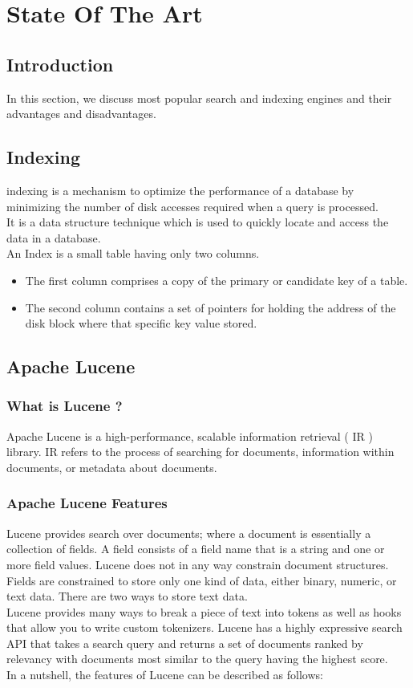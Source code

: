\chapter{State Of The Art}

\section{Introduction}
In this section, we discuss most popular search and indexing engines and their advantages and disadvantages.
 

\section{Indexing}

indexing is a mechanism to optimize the performance of a database by minimizing the number of disk accesses required when a query is processed. \\
It is a data structure technique which is used to quickly locate and access the data in a database.\\
An Index is a small table having only two columns.
\begin{itemize}
    \item The first  column comprises a copy of the primary or candidate key of a table.
    \item The second column contains a set of pointers for holding the address of the disk block where that specific key value stored.
\end{itemize}

\section{Apache Lucene}
\subsection{What is Lucene ?}
Apache Lucene is a high-performance, scalable information retrieval ( IR ) library. IR refers to
the process of searching for documents, information within documents, or metadata
about documents.

\subsection{Apache Lucene Features}
Lucene provides search over documents; where a document is essentially a collection of fields. 
A field consists of a field name that is a string and one or more field values.
Lucene does not in any way constrain document structures. Fields are constrained to store only one kind of data, either binary, numeric, or text data. There are two ways to store text data.\\
Lucene provides many ways to break a piece of text into tokens as well as hooks that allow you to write custom tokenizers. Lucene has a highly expressive search API that takes a search query and returns a set of documents ranked by relevancy with documents most similar to the query having the highest score.\\
In a nutshell, the features of Lucene can be described as follows:
